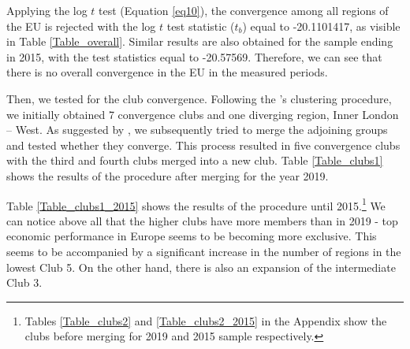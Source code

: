 \documentclass[11pt]{article}
\begin{document}
\begin{table}[!htbp] \centering 
 \caption{Log $t$ test result for all regions} 
  \label{Table_overall} 
\end{table}

Applying the log $t$ test (Equation \ref{eq10}), the convergence among all regions of the EU is rejected with the log $t$ test statistic ($t_b$) equal to -20.1101417, as visible in Table \ref{Table_overall}. Similar results are also obtained for the sample ending in 2015, with the test statistics equal to -20.57569. Therefore, we can see that there is no overall convergence in the EU in the measured periods.

Then, we tested for the club convergence. Following the \citeauthor{phillips2007transition}'s clustering procedure, we initially obtained 7 convergence clubs and one diverging region, Inner London – West. As suggested by \citet{bartkowska2012regional}, we subsequently tried to merge the adjoining groups and tested whether they converge. This process resulted in five convergence clubs with the third and fourth clubs merged into a new club. Table \ref{Table_clubs1} shows the results of the procedure after merging for the year 2019.

Table \ref{Table_clubs1_2015} shows the results of the \citeauthor{phillips2007transition} procedure until 2015.\footnote{Tables \ref{Table_clubs2} and \ref{Table_clubs2_2015} in the Appendix show the clubs before merging for 2019 and 2015 sample respectively.}  We can notice above all that the higher clubs have more members than in 2019 - top economic performance in Europe seems to be becoming more exclusive. This seems to be accompanied by a significant increase in the number of regions in the lowest Club 5. On the other hand, there is also an expansion of the intermediate Club 3.
\end{document}
